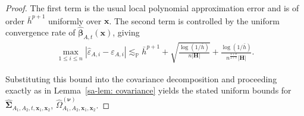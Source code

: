 \documentclass[10pt,a4paper]{amsart}
\newcommand{\bH}{\mathbf{H}}
\newcommand{\bSigma}{\boldsymbol{\Sigma}}
\newcommand{\bbeta}{\boldsymbol{\beta}}
\newcommand{\bnu}{\boldsymbol{\nu}}
\newcommand{\bx}{\mathbf{x}}
\newcommand{\lessp}{\lesssim_{\mathbb{P}}}
\begin{document}
\begin{proof}
The first term is the usual local polynomial approximation error and is of order $\bar{h}^{p+1}$ uniformly over $\bx$.
The second term is controlled by the uniform convergence rate of
$\widehat{\bbeta}_{A,t}(\bx)$, giving
\begin{align*}
    \max_{1\le i\le n}
    |\widehat{\varepsilon}_{A,i}-\varepsilon_{A,i}|
    \lessp
    \bar{h}^{p+1}
    + \sqrt{\frac{\log(1/\bar{h})}{n |\bH|}}
    + \frac{\log(1/\bar{h})}{n^{\frac{1+v}{2+v}}|\bH|}.
\end{align*}

Substituting this bound into the covariance decomposition and proceeding exactly as in Lemma~\ref{sa-lem: covariance} yields the stated uniform bounds for
$\widehat{\bSigma}_{A_1,A_2,t,\bx_1,\bx_2}$,
$\widehat{\Omega}_{A_1,A_2,\bx_1,\bx_2}^{(\bnu)}$.
\end{proof}
\end{document}
